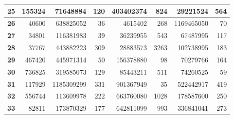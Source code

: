 \documentclass[12pt]{article}
\begin{document}
\begin{table}[!htbp]
{\begin{tabular}{crrrrrrr}
\multicolumn{1}{|c|}{\textbf{25}} & \multicolumn{1}{r|}{155324} & \multicolumn{1}{r|}{71648884} & \multicolumn{1}{r|}{120} & \multicolumn{1}{r|}{403402374} & \multicolumn{1}{r|}{824} & \multicolumn{1}{r|}{29221524} & \multicolumn{1}{r|}{564} \\ \hline
\multicolumn{1}{|c|}{\textbf{26}} & \multicolumn{1}{r|}{40600} & \multicolumn{1}{r|}{638825052} & \multicolumn{1}{r|}{36} & \multicolumn{1}{r|}{4615402} & \multicolumn{1}{r|}{268} & \multicolumn{1}{r|}{1169465050} & \multicolumn{1}{r|}{70} \\ \hline
\multicolumn{1}{|c|}{\textbf{27}} & \multicolumn{1}{r|}{34801} & \multicolumn{1}{r|}{116381983} & \multicolumn{1}{r|}{39} & \multicolumn{1}{r|}{36239955} & \multicolumn{1}{r|}{543} & \multicolumn{1}{r|}{67487995} & \multicolumn{1}{r|}{117} \\ \hline
\multicolumn{1}{|c|}{\textbf{28}} & \multicolumn{1}{r|}{37767} & \multicolumn{1}{r|}{443882223} & \multicolumn{1}{r|}{309} & \multicolumn{1}{r|}{28883573} & \multicolumn{1}{r|}{3263} & \multicolumn{1}{r|}{102738995} & \multicolumn{1}{r|}{183} \\ \hline
\multicolumn{1}{|c|}{\textbf{29}} & \multicolumn{1}{r|}{467420} & \multicolumn{1}{r|}{445971314} & \multicolumn{1}{r|}{50} & \multicolumn{1}{r|}{156378880} & \multicolumn{1}{r|}{98} & \multicolumn{1}{r|}{70279766} & \multicolumn{1}{r|}{164} \\ \hline
\multicolumn{1}{|c|}{\textbf{30}} & \multicolumn{1}{r|}{736825} & \multicolumn{1}{r|}{319585073} & \multicolumn{1}{r|}{129} & \multicolumn{1}{r|}{85443211} & \multicolumn{1}{r|}{511} & \multicolumn{1}{r|}{74260525} & \multicolumn{1}{r|}{59} \\ \hline
\multicolumn{1}{|c|}{\textbf{31}} & \multicolumn{1}{r|}{117929} & \multicolumn{1}{r|}{1185309299} & \multicolumn{1}{r|}{331} & \multicolumn{1}{r|}{901367949} & \multicolumn{1}{r|}{35} & \multicolumn{1}{r|}{522442917} & \multicolumn{1}{r|}{419} \\ \hline
\multicolumn{1}{|c|}{\textbf{32}} & \multicolumn{1}{r|}{556744} & \multicolumn{1}{r|}{113609978} & \multicolumn{1}{r|}{222} & \multicolumn{1}{r|}{663760080} & \multicolumn{1}{r|}{1028} & \multicolumn{1}{r|}{178587600} & \multicolumn{1}{r|}{250} \\ \hline
\multicolumn{1}{|c|}{\textbf{33}} & \multicolumn{1}{r|}{82811} & \multicolumn{1}{r|}{173870329} & \multicolumn{1}{r|}{177} & \multicolumn{1}{r|}{642811099} & \multicolumn{1}{r|}{993} & \multicolumn{1}{r|}{336841041} & \multicolumn{1}{r|}{273} \\ \hline

\end{tabular}}
\end{table}
\end{document}
